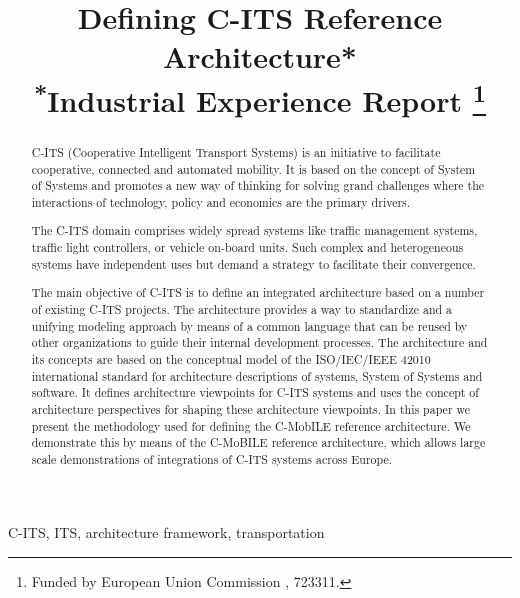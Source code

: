 \documentclass[conference]{IEEEtran}
\begin{document}
\title{Defining C-ITS Reference Architecture* \\
  {\footnotesize \textsuperscript{*}Industrial Experience Report}
  \thanks{Funded by European Union Commission , 723311.}
}

\author{
}

\maketitle


\begin{abstract}
C-ITS (Cooperative Intelligent Transport Systems) is an initiative to facilitate cooperative, connected and automated mobility.
It is based on the concept of System of Systems and promotes a new way of thinking for solving grand challenges where the interactions of technology, policy and economics are the primary drivers.

The C-ITS domain comprises widely spread systems like traffic management systems, traffic light controllers, or vehicle on-board units.
Such complex and heterogeneous systems have independent uses but demand a strategy to facilitate their convergence.

The main objective of C-ITS is to define an integrated architecture based on a number of existing C-ITS projects.
The architecture provides a way to standardize and a unifying modeling approach by means of a common language that can be reused by other organizations to guide their internal development processes.
The architecture and its concepts are based on the conceptual model of the ISO/IEC/IEEE 42010 \cite{iso42010} international standard for architecture descriptions of systems, System of Systems and software.
It defines architecture viewpoints for C-ITS systems and uses the concept of architecture perspectives for shaping these architecture viewpoints.
In this paper we present the methodology used for defining the C-MobILE reference architecture.
We demonstrate this by means of the C-MoBILE reference architecture, which allows large scale demonstrations of integrations of C-ITS systems across Europe.
\end{abstract}

\begin{IEEEkeywords}
C-ITS, ITS, architecture framework, transportation
\end{IEEEkeywords}
\end{document}
